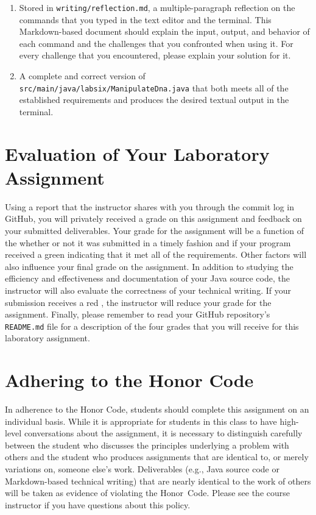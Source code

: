 \documentclass[11pt]{article}
\newcommand{\mainprogramsource}{\lstinline{src/main/java/labsix/ManipulateDna.java}}
\newcommand{\reflection}{\lstinline{writing/reflection.md}}
\newcommand{\program}[1]{\lstinline{#1}}
\newcommand{\checkmark}{\ding{51}}
\newcommand{\naughtmark}{\ding{55}}
\begin{document}
\begin{enumerate}

  \setlength{\itemsep}{0in}

\item Stored in \reflection{}, a multiple-paragraph reflection on the commands
  that you typed in the text editor and the terminal. This Markdown-based
  document should explain the input, output, and behavior of each command and
  the challenges that you confronted when using it. For every challenge that you
  encountered, please explain your solution for it.


\item A complete and correct version of \mainprogramsource{} that both meets all
  of the established requirements and produces the desired textual output in the
  terminal.

\end{enumerate}

\section*{Evaluation of Your Laboratory Assignment}

Using a report that the instructor shares with you through the commit log in
GitHub, you will privately received a grade on this assignment and feedback on
your submitted deliverables. Your grade for the assignment will be a function of
the whether or not it was submitted in a timely fashion and if your program
received a green \checkmark{} indicating that it met all of the requirements.
Other factors will also influence your final grade on the assignment. In
addition to studying the efficiency and effectiveness and documentation of your
Java source code, the instructor will also evaluate the correctness of your
technical writing. If your submission receives a red \naughtmark{}, the
instructor will reduce your grade for the assignment. Finally, please remember
to read your GitHub repository's \program{README.md} file for a description of
the four grades that you will receive for this laboratory assignment.

\section*{Adhering to the Honor Code}

In adherence to the Honor Code, students should complete this assignment on an
individual basis. While it is appropriate for students in this class to have
high-level conversations about the assignment, it is necessary to distinguish
carefully between the student who discusses the principles underlying a
problem with others and the student who produces assignments that are
identical to, or merely variations on, someone else's work. Deliverables
(e.g., Java source code or Markdown-based technical writing) that are nearly
identical to the work of others will be taken as evidence of violating the
\mbox{Honor Code}. Please see the course instructor if you have questions
about this policy.
\end{document}

